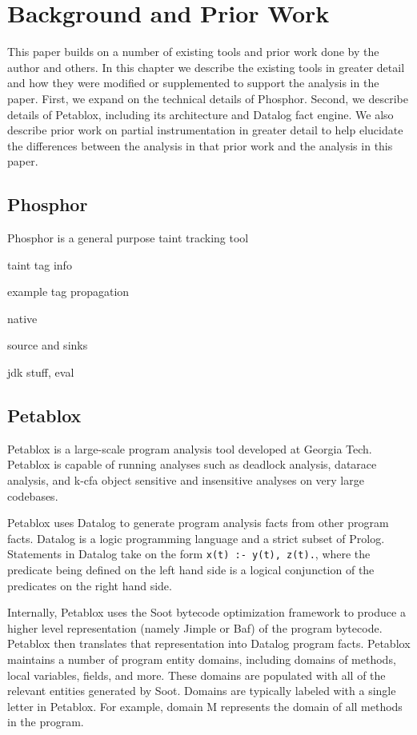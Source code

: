 \chapter{Background and Prior Work}
This paper builds on a number of existing tools and prior work done by the author and others. In this chapter we describe the existing tools in greater detail and how they were modified or supplemented to support the analysis in the paper. First, we expand on the technical details of Phosphor. Second, we describe details of Petablox, including its architecture and Datalog fact engine. We also describe prior work on partial instrumentation in greater detail to help elucidate the differences between the analysis in that prior work and the analysis in this paper.
\section{Phosphor}
Phosphor \cite{phosphor_oopsla} is a general purpose taint tracking tool

taint tag info

example tag propagation

native

source and sinks

jdk stuff, eval
\section{Petablox}
Petablox \cite{petablox} is a large-scale program analysis tool developed at Georgia Tech. Petablox is capable of running analyses such as deadlock analysis, datarace analysis, and k-cfa object sensitive and insensitive analyses on very large codebases.

Petablox uses Datalog \cite{datalog} to generate program analysis facts from other program facts. Datalog is a logic programming language and a strict subset of Prolog. Statements in Datalog take on the form \texttt{x(t) :- y(t), z(t).}, where the predicate being defined on the left hand side is a logical conjunction of the predicates on the right hand side.

Internally, Petablox uses the Soot bytecode optimization framework \cite{vallee1999soot} to produce a higher level representation (namely Jimple or Baf) of the program bytecode. Petablox then translates that representation into Datalog program facts. Petablox maintains a number of program entity domains, including domains of methods, local variables, fields, and more. These domains are populated with all of the relevant entities generated by Soot. Domains are typically labeled with a single letter in Petablox. For example, domain M represents the domain of all methods in the program.

